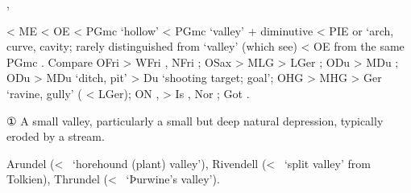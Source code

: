 \documentclass[12pt,letterpaper,oneside,article,draft]{memoir}
\begin{document}
\begin{Lemma}
\begin{Also}
	, 
\end{Also}
\begin{Etymology}
	< ME  < OE  < PGmc  ‘hollow’ < PGmc  ‘valley’ +
		 diminutive < PIE  or  ‘arch, curve, cavity;
		rarely distinguished from  ‘valley’ (which see) < OE 
		from the same PGmc .
	Compare
	OFri  > WFri , NFri ;
	OSax  > MLG  > LGer ;
	ODu  > MDu ;
	ODu  > MDu  ‘ditch, pit’ > Du  ‘shooting target; goal’;
	OHG  > MHG  > Ger  ‘ravine, gully’ ( < LGer);
	ON ,  > Is , Nor ;
	Got  .
\end{Etymology}
\begin{Definitions}
	① A small valley, particularly a small but deep natural depression, typically eroded by a stream.
\end{Definitions}
\begin{Examples}
	Arundel (<~ ‘horehound (plant) valley’),
	Rivendell (<~ ‘split valley’ from Tolkien),
	Thrundel (<~ ‘Þurwine’s valley’).
\end{Examples}
\end{Lemma}
\end{document}

